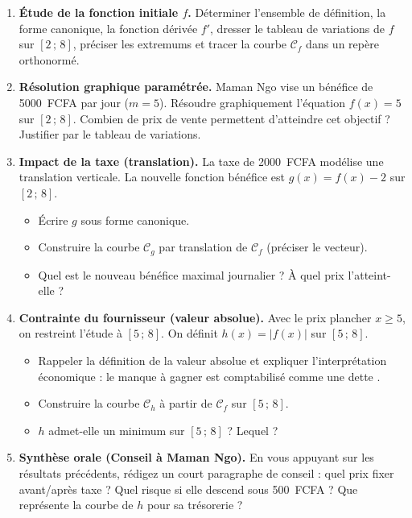 \documentclass[11pt]{article}
\newcounter{popsec}
\newcounter{popsub}
\newcommand{\courssub}[1]{%
  \stepcounter{popsub}%
  \par\vspace{9pt}\noindent{\popxbold\fontsize{11.5}{13}\selectfont\color{popink}{\color{poporange}\thepopsec.\thepopsub}\hspace{6pt}#1}\par\nopagebreak\vspace{4pt}
}
\begin{document}
\courssub{Consignes}
\begin{enumerate}
    \item \textbf{Étude de la fonction initiale $f$.} Déterminer l'ensemble de définition, la forme canonique, la fonction dérivée $f'$, dresser le tableau de variations de $f$ sur $[2\,;\,8]$, préciser les extremums et tracer la courbe $\mathcal{C}_f$ dans un repère orthonormé.
    \item \textbf{Résolution graphique paramétrée.} Maman Ngo vise un bénéfice de \SI{5000}{FCFA} par jour ($m=5$). Résoudre graphiquement l'équation $f(x)=5$ sur $[2\,;\,8]$. Combien de prix de vente permettent d'atteindre cet objectif ? Justifier par le tableau de variations.
    \item \textbf{Impact de la taxe (translation).} La taxe de \SI{2000}{FCFA} modélise une translation verticale. La nouvelle fonction bénéfice est $g(x) = f(x) - 2$ sur $[2\,;\,8]$.
    \begin{itemize}
        \item Écrire $g$ sous forme canonique.
        \item Construire la courbe $\mathcal{C}_g$ par translation de $\mathcal{C}_f$ (préciser le vecteur).
        \item Quel est le nouveau bénéfice maximal journalier ? À quel prix l'atteint-elle ?
    \end{itemize}
    \item \textbf{Contrainte du fournisseur (valeur absolue).} Avec le prix plancher $x \ge 5$, on restreint l'étude à $[5\,;\,8]$. On définit $h(x) = |f(x)|$ sur $[5\,;\,8]$.
    \begin{itemize}
        \item Rappeler la définition de la valeur absolue et expliquer l'interprétation économique : \og le manque à gagner est comptabilisé comme une dette \fg.
        \item Construire la courbe $\mathcal{C}_h$ à partir de $\mathcal{C}_f$ sur $[5\,;\,8]$.
        \item $h$ admet-elle un minimum sur $[5\,;\,8]$ ? Lequel ?
    \end{itemize}
    \item \textbf{Synthèse orale (Conseil à Maman Ngo).} En vous appuyant sur les résultats précédents, rédigez un court paragraphe de conseil : quel prix fixer avant/après taxe ? Quel risque si elle descend sous \SI{500}{FCFA} ? Que représente la courbe de $h$ pour sa trésorerie ?
\end{enumerate}
\end{document}
